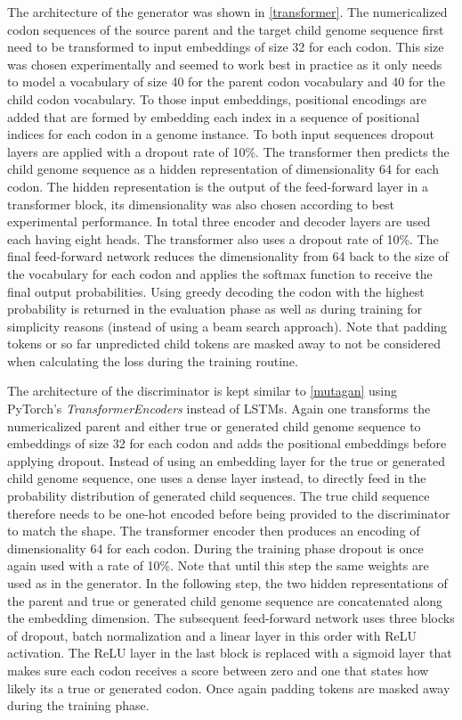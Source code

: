 The architecture of the generator was shown in \autoref{transformer}. The numericalized codon sequences of the source parent and the target child genome sequence first need to be transformed to input embeddings of size 32 for each codon. This size was chosen experimentally and seemed to work best in practice as it only needs to model a vocabulary of size 40 for the parent codon vocabulary and 40 for the child codon vocabulary. To those input embeddings, positional encodings are added that are formed by embedding each index in a sequence of positional indices for each codon in a genome instance. To both input sequences dropout layers are applied with a dropout rate of 10\%. The transformer then predicts the child genome sequence as a hidden representation of dimensionality 64 for each codon. The hidden representation is the output of the feed-forward layer in a transformer block, its dimensionality was also chosen according to best experimental performance. In total three encoder and decoder layers are used each having eight heads. The transformer also uses a dropout rate of 10\%. The final feed-forward network reduces the dimensionality from 64 back to the size of the vocabulary for each codon and applies the softmax function to receive the final output probabilities. Using greedy decoding the codon with the highest probability is returned in the evaluation phase as well as during training for simplicity reasons (instead of using a beam search approach). Note that padding tokens or so far unpredicted child tokens are masked away to not be considered when calculating the loss during the training routine.

The architecture of the discriminator is kept similar to \autoref{mutagan} using PyTorch's \textit{TransformerEncoders} instead of \acp{LSTM}. Again one transforms the numericalized parent and either true or generated child genome sequence to embeddings of size 32 for each codon and adds the positional embeddings before applying dropout. Instead of using an embedding layer for the true or generated child genome sequence, one uses a dense layer instead, to directly feed in the probability distribution of generated child sequences. The true child sequence therefore needs to be one-hot encoded before being provided to the discriminator to match the shape. The transformer encoder then produces an encoding of dimensionality 64 for each codon. During the training phase dropout is once again used with a rate of 10\%. Note that until this step the same weights are used as in the generator. In the following step, the two hidden representations of the parent and true or generated child genome sequence are concatenated along the embedding dimension. The subsequent feed-forward network uses three blocks of dropout, batch normalization and a linear layer in this order with \ac{ReLU} activation. The \ac{ReLU} layer in the last block is replaced with a sigmoid layer that makes sure each codon receives a score between zero and one that states how likely its a true or generated codon. Once again padding tokens are masked away during the training phase.

